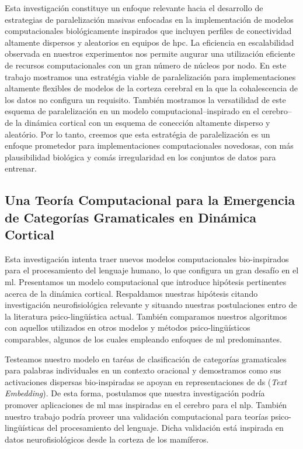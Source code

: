 Esta investigación \cite{} constituye un enfoque relevante hacia el desarrollo de estrategias de paralelización masivas enfocadas en la implementación de modelos computacionales biológicamente inspirados que incluyen perfiles de conectividad altamente dispersos y aleatorios en equipos de \gls{hpc}.
La eficiencia en escalabilidad observada en nuestros experimentos nos permite augurar una utilización eficiente de recursos computacionales con un gran número de núcleos por nodo.
En este trabajo mostramos una estratégia viable de paralelización para implementaciones altamente flexibles de modelos de la corteza cerebral en la que la cohalescencia de los datos no configura un requisito.
También mostramos la versatilidad de este esquema de paralelización en un modelo computacional--inspirado en el cerebro--de la dinámica cortical con un esquema de conección altamente disperso y aleatório.
Por lo tanto, creemos que esta estratégia de paralelización es un enfoque prometedor para implementaciones computacionales novedosas, con más plausibilidad biológica y comás irregularidad en los conjuntos de datos para entrenar.


\subsection{Una Teoría Computacional para la Emergencia de Categorías Gramaticales en Dinámica Cortical}


Esta investigación \cite{} intenta traer nuevos modelos computacionales bio-inspirados para el procesamiento del lenguaje humano,
lo que configura un gran desafío en el \gls{ml}.
Presentamos un modelo computacional que introduce hipótesis pertinentes acerca de la dinámica cortical.
Respaldamos nuestras hipótesis citando investigación neurofisiológica relevante y situando nuestras postulaciones entro de la literatura psico-lingüística actual.
También comparamos nuestros algoritmos con aquellos utilizados en otros modelos y métodos psico-lingüísticos comparables, algunos de los cuales empleando enfoques de \gls{ml} predominantes. 

Testeamos nuestro modelo en taréas de clasificación de categorías gramaticales para palabras individuales en un contexto oracional y demostramos como sus activaciones dispersas bio-inspiradas se apoyan en representaciones de \gls{ds} (\emph{Text Embedding}).
De esta forma, postulamos que nuestra investigación podría promover aplicaciones de \gls{ml} mas inspiradas en el cerebro para el \gls{nlp}.
También nuestro trabajo podría proveer una validación computacional para teorías psico-lingüísticas del procesamiento del lenguaje.
Dicha validación está inspirada en datos neurofisiológicos desde la corteza de los mamíferos.










